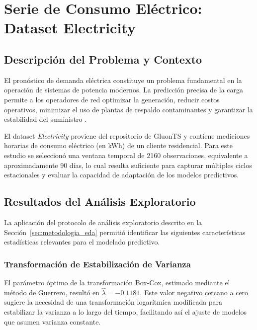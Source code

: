 \section{Serie de Consumo Eléctrico: Dataset Electricity}
\label{sec:aplicacion_electricidad}

\subsection{Descripción del Problema y Contexto}
\label{subsec:elec_contexto}

El pronóstico de demanda eléctrica constituye un problema fundamental en la operación de sistemas de potencia modernos. La predicción precisa de la carga permite a los operadores de red optimizar la generación, reducir costos operativos, minimizar el uso de plantas de respaldo contaminantes y garantizar la estabilidad del suministro \parencite{Salinas2020}.

El dataset \textit{Electricity} proviene del repositorio de GluonTS \parencite{gluonts_jmlr} y contiene mediciones horarias de consumo eléctrico (en kWh) de un cliente residencial. Para este estudio se seleccionó una ventana temporal de 2160 observaciones, equivalente a aproximadamente 90 días, lo cual resulta suficiente para capturar múltiples ciclos estacionales y evaluar la capacidad de adaptación de los modelos predictivos.

\subsection{Resultados del Análisis Exploratorio}
\label{subsec:elec_eda_resultados}

La aplicación del protocolo de análisis exploratorio descrito en la Sección~\ref{sec:metodologia_eda} permitió identificar las siguientes características estadísticas relevantes para el modelado predictivo.

\subsubsection{Transformación de Estabilización de Varianza}

El parámetro óptimo de la transformación Box-Cox, estimado mediante el método de Guerrero, resultó en $\hat{\lambda} = -0.1181$. Este valor negativo cercano a cero sugiere la necesidad de una transformación logarítmica modificada para estabilizar la varianza a lo largo del tiempo, facilitando así el ajuste de modelos que asumen varianza constante.

